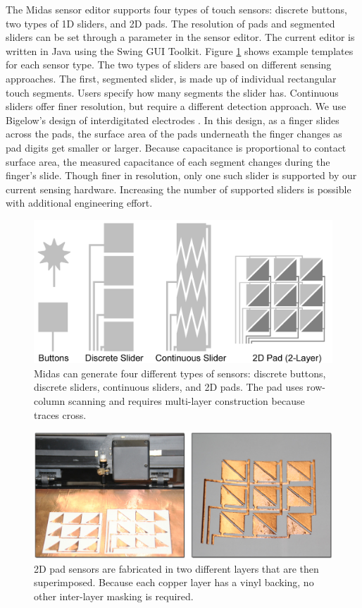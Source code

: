 The Midas sensor editor supports four types of touch sensors:
discrete buttons, two types of 1D sliders, and 2D pads. The
resolution of pads and segmented sliders can be set through a
parameter in the sensor editor. The current editor is written in
Java using the Swing GUI Toolkit. Figure \ref{fig:midas-templates} shows example
templates for each sensor type. The two types of sliders are
based on different sensing approaches. The first, segmented
slider, is made up of individual rectangular touch segments.
Users specify how many segments the slider has. Continuous
sliders offer finer resolution, but require a different detection
approach. We use Bigelow's design of interdigitated electrodes
\cite{bigelow-interdigitated}. In this design, as a finger slides across the pads,
the surface area of the pads underneath the finger changes as
pad digits get smaller or larger. Because capacitance is proportional
to contact surface area, the measured capacitance of
each segment changes during the finger's slide. Though finer
in resolution, only one such slider is supported by our current
sensing hardware. Increasing the number of supported
sliders is possible with additional engineering effort.


\begin{figure}
\centering
\includegraphics[width=\textwidth]{figures/midas/pad-templates.png}
\caption{Midas can generate four different types of sensors: discrete buttons, discrete sliders, continuous sliders, and 2D pads. The pad uses row-column scanning and requires multi-layer construction because traces cross.} 
\label{fig:midas-templates}
\end{figure}

\begin{figure}
\centering
\includegraphics[width=\textwidth]{figures/midas/2dgrid.jpg}
\caption{2D pad sensors are fabricated in two different layers that are then superimposed. Because each copper layer has a vinyl backing, no other inter-layer masking is required.} 
\label{fig:midas-layering}
\end{figure}

